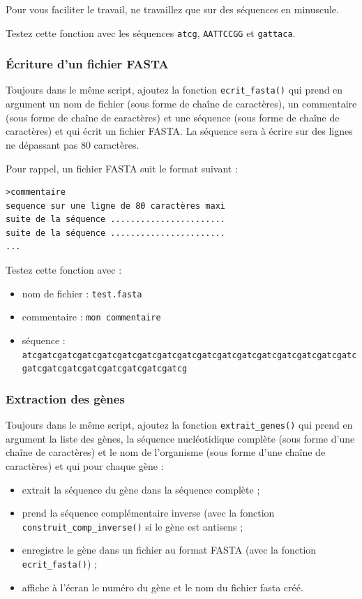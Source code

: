 \documentclass[a4paper,11pt,twoside]{book}
\providecommand{\tightlist}{%
  \setlength{\itemsep}{0pt}\setlength{\parskip}{0pt}}
\begin{document}
Pour vous faciliter le travail, ne travaillez que sur des séquences en
minuscule.

Testez cette fonction avec les séquences \texttt{atcg},
\texttt{AATTCCGG} et \texttt{gattaca}.

\subsubsection{Écriture d'un fichier
FASTA}\label{uxe9criture-dun-fichier-fasta-1}

Toujours dans le même script, ajoutez la fonction
\texttt{ecrit\_fasta()} qui prend en argument un nom de fichier (sous
forme de chaîne de caractères), un commentaire (sous forme de chaîne de
caractères) et une séquence (sous forme de chaîne de caractères) et qui
écrit un fichier FASTA. La séquence sera à écrire sur des lignes ne
dépassant pas 80 caractères.

Pour rappel, un fichier FASTA suit le format suivant :

\begin{verbatim}
>commentaire
sequence sur une ligne de 80 caractères maxi
suite de la séquence .......................
suite de la séquence .......................
...
\end{verbatim}

Testez cette fonction avec :

\begin{itemize}
\tightlist
\item
  nom de fichier : \texttt{test.fasta}
\item
  commentaire : \texttt{mon\ commentaire}
\item
  séquence :
  \texttt{atcgatcgatcgatcgatcgatcgatcgatcgatcgatcgatcgatcgatcgatcgatcgatcgatcgatcgatcgatcgatcgatcgatcgatcgatcg}
\end{itemize}

\subsubsection{Extraction des gènes}\label{extraction-des-guxe8nes-1}

Toujours dans le même script, ajoutez la fonction
\texttt{extrait\_genes()} qui prend en argument la liste des gènes, la
séquence nucléotidique complète (sous forme d'une chaîne de caractères)
et le nom de l'organisme (sous forme d'une chaîne de caractères) et qui
pour chaque gène :

\begin{itemize}
\tightlist
\item
  extrait la séquence du gène dans la séquence complète ;
\item
  prend la séquence complémentaire inverse (avec la fonction
  \texttt{construit\_comp\_inverse()} si le gène est antisens ;
\item
  enregistre le gène dans un fichier au format FASTA (avec la fonction
  \texttt{ecrit\_fasta()}) ;
\item
  affiche à l'écran le numéro du gène et le nom du fichier fasta créé.
\end{itemize}
\end{document}
